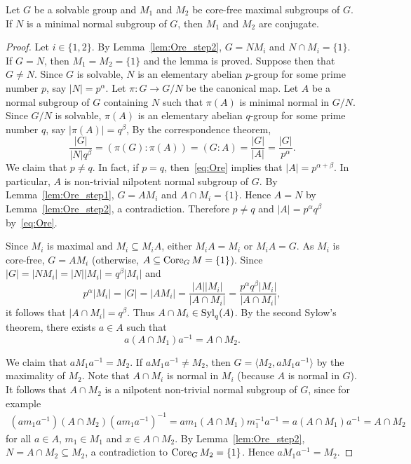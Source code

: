 \begin{lemma}
    \label{lem:Ore_step3}
    Let $G$ be a solvable group and $M_1$ and $M_2$ be core-free 
    maximal subgroups of $G$. If $N$ is a minimal normal subgroup of $G$, then
    $M_1$ and $M_2$ are conjugate. 
\end{lemma}

\begin{proof}
    Let $i\in\{1,2\}$. 
    By Lemma~\ref{lem:Ore_step2}, $G=NM_i$ and $N\cap M_i=\{1\}$. If $G=N$, then 
    $M_1=M_2=\{1\}$ and the lemma is proved. Suppose then that $G\ne N$. Since 
    $G$ is solvable, $N$ is an elementary abelian $p$-group for some prime number $p$, 
    say $|N|=p^{\alpha}$. Let $\pi\colon G\to G/N$ be the canonical map. Let $A$ be a normal subgroup of $G$ 
    containing $N$ 
    such that $\pi(A)$ is minimal normal in $G/N$. Since $G/N$ is solvable, $\pi(A)$ is an 
    elementary abelian $q$-group for some prime number $q$, say $|\pi(A)|=q^\beta$, 
    By the correspondence theorem, 
    \begin{equation}
        \label{eq:Ore}
        \frac{|G|}{|N|q^\beta}=(\pi(G):\pi(A))=(G:A)=\frac{|G|}{|A|}=\frac{|G|}{p^\alpha}.
    \end{equation}
    We claim that $p\ne q$. In fact, if $p=q$, then~\eqref{eq:Ore} implies that $|A|=p^{\alpha+\beta}$. In particular, 
    $A$ is non-trivial nilpotent normal subgroup of $G$. 
    By Lemma~\ref{lem:Ore_step1}, $G=AM_i$ and $A\cap M_i=\{1\}$. Hence $A=N$ by Lemma~\ref{lem:Ore_step2}, a contradiction. 
    Therefore $p\ne q$ and $|A|=p^{\alpha}q^\beta$ by~\eqref{eq:Ore}. 

    Since $M_i$ is maximal and $M_i\subseteq M_iA$, either $M_iA=M_i$ or $M_iA=G$. As $M_i$ is core-free, 
    $G=AM_i$ (otherwise, $A\subseteq\operatorname{Core}_GM=\{1\}$). 
    Since $|G|=|NM_i|=|N||M_i|=q^\beta|M_i|$ and 
    \[
    p^\alpha|M_i|=|G|=|AM_i|=\frac{|A||M_i|}{|A\cap M_i|}=\frac{p^\alpha q^\beta|M_i|}{|A\cap M_i|}, 
    \]
    it follows that $|A\cap M_i|=q^\beta$. Thus $A\cap M_i\in\mathrm{Syl}_q(A)$. 
    By the second Sylow's theorem, there exists $a\in A$ such that 
    \[
    a(A\cap M_1)a^{-1}=A\cap M_2.
    \]

    We claim that $aM_1a^{-1}=M_2$. 
    If $aM_1a^{-1}\ne M_2$, then $G=\langle M_2,aM_1a^{-1}\rangle$ by the maximality of $M_2$. Note that  
    $A\cap M_i$ is normal in $M_i$ (because $A$ is normal in $G$). It follows that 
    $A\cap M_2$ is a nilpotent non-trivial 
    normal subgroup of $G$, since for example 
    \begin{align*}
    (am_1a^{-1})(A\cap M_2)(am_1a^{-1})^{-1}
    =am_1(A\cap M_1)m_1^{-1}a^{-1}
    =a(A\cap M_1)a^{-1}
    =A\cap M_2
    \end{align*}
    for all $a\in A$, $m_1\in M_1$ and $x\in A\cap M_2$. By Lemma~\ref{lem:Ore_step2}, 
    $N=A\cap M_2\subseteq M_2$, a contradiction to $\operatorname{Core}_GM_2=\{1\}$. Hence 
    $aM_1a^{-1}=M_2$. 
\end{proof}

